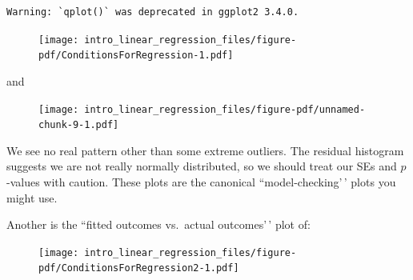 \documentclass[
  letterpaper,
  DIV=11,
  numbers=noendperiod]{scrreprt}
\newenvironment{Shaded}{\begin{snugshade}}{\end{snugshade}}
\newcommand{\AttributeTok}[1]{\textcolor[rgb]{0.49,0.56,0.16}{#1}}
\newcommand{\DecValTok}[1]{\textcolor[rgb]{0.25,0.63,0.44}{#1}}
\newcommand{\FunctionTok}[1]{\textcolor[rgb]{0.02,0.16,0.49}{#1}}
\newcommand{\NormalTok}[1]{\textcolor[rgb]{0.00,0.44,0.13}{#1}}
\newcommand{\OtherTok}[1]{\textcolor[rgb]{0.00,0.44,0.13}{#1}}
\newcommand{\SpecialCharTok}[1]{\textcolor[rgb]{0.25,0.44,0.63}{#1}}
\newcommand{\StringTok}[1]{\textcolor[rgb]{0.25,0.44,0.63}{#1}}
\begin{document}
\begin{verbatim}
Warning: `qplot()` was deprecated in ggplot2 3.4.0.
\end{verbatim}

\begin{figure}[H]

{\centering \texttt{[image: intro\_linear\_regression\_files/figure-pdf/ConditionsForRegression-1.pdf]}

}

\end{figure}

and

\begin{Shaded}
\end{Shaded}

\begin{figure}[H]

{\centering \texttt{[image: intro\_linear\_regression\_files/figure-pdf/unnamed-chunk-9-1.pdf]}

}

\end{figure}

We see no real pattern other than some extreme outliers. The residual
histogram suggests we are not really normally distributed, so we should
treat our SEs and \(p\)-values with caution. These plots are the
canonical ``model-checking'\,' plots you might use.

Another is the ``fitted outcomes vs.~actual outcomes'\,' plot of:

\begin{Shaded}
\end{Shaded}

\begin{figure}[H]

{\centering \texttt{[image: intro\_linear\_regression\_files/figure-pdf/ConditionsForRegression2-1.pdf]}

}

\end{figure}
\end{document}
